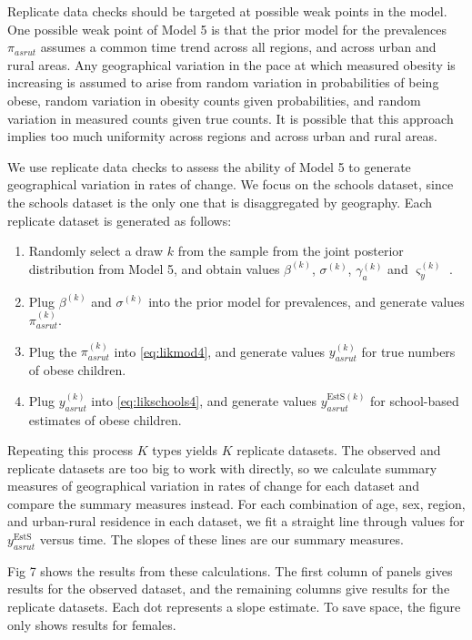 \documentclass[10pt,letterpaper]{article}
\providecommand{\tightlist}{%
  \setlength{\itemsep}{0pt}\setlength{\parskip}{0pt}}
\begin{document}
Replicate data checks should be targeted at possible weak points in the
model. One possible weak point of Model 5 is that the prior model for
the prevalences \(\pi_{asrut}\) assumes a common time trend across all
regions, and across urban and rural areas. Any geographical variation in
the pace at which measured obesity is increasing is assumed to arise
from random variation in probabilities of being obese, random variation
in obesity counts given probabilities, and random variation in measured
counts given true counts. It is possible that this approach implies too
much uniformity across regions and across urban and rural areas.

We use replicate data checks to assess the ability of Model 5 to
generate geographical variation in rates of change. We focus on the
schools dataset, since the schools dataset is the only one that is
disaggregated by geography. Each replicate dataset is generated as
follows:

\begin{enumerate}
\def\labelenumi{\arabic{enumi}.}
\tightlist
\item
  Randomly select a draw \(k\) from the sample from the joint posterior
  distribution from Model 5, and obtain values \(\beta^{(k)}\),
  \(\sigma^{(k)}\), \(\gamma_a^{(k)}\) and \(\varsigma_y^{(k)}\) .
\item
  Plug \(\beta^{(k)}\) and \(\sigma^{(k)}\) into the prior model for
  prevalences, and generate values \(\pi_{asrut}^{(k)}\).
\item
  Plug the \(\pi_{asrut}^{(k)}\) into \eqref{eq:likmod4}, and generate
  values \(y_{asrut}^{(k)}\) for true numbers of obese children.
\item
  Plug \(y_{asrut}^{(k)}\) into \eqref{eq:likschools4}, and generate
  values \(y_{asrut}^{\text{EstS}(k)}\) for school-based estimates of
  obese children.
\end{enumerate}

Repeating this process \(K\) types yields \(K\) replicate datasets. The
observed and replicate datasets are too big to work with directly, so we
calculate summary measures of geographical variation in rates of change
for each dataset and compare the summary measures instead. For each
combination of age, sex, region, and urban-rural residence in each
dataset, we fit a straight line through values for
\(y_{asrut}^{\text{EstS}}\) versus time. The slopes of these lines are
our summary measures.

Fig 7 shows the results from these calculations. The first column of
panels gives results for the observed dataset, and the remaining columns
give results for the replicate datasets. Each dot represents a slope
estimate. To save space, the figure only shows results for females.
\end{document}
